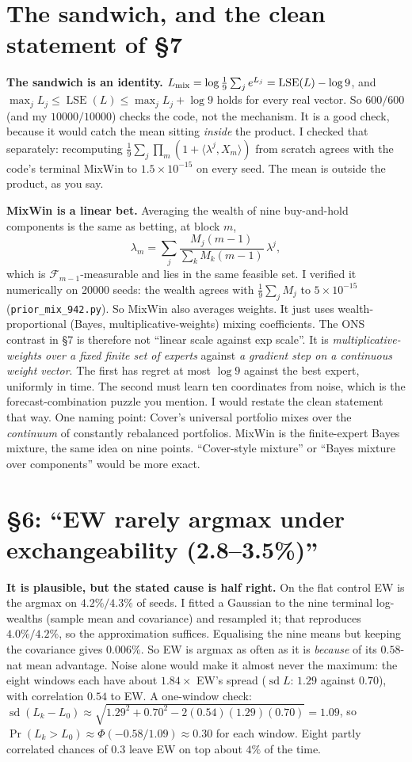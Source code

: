 \documentclass[11pt]{article}
\begin{document}
\section{The sandwich, and the clean statement of \S7}\label{sec:sandwich}
\textbf{The sandwich is an identity.} $L_{\rm mix}=\log\frac19\sum_j e^{L_j}=\operatorname{LSE}(L)-\log9$, and $\max_jL_j\le\operatorname{LSE}(L)\le\max_jL_j+\log9$ holds for every real vector. So $600/600$ (and my $10000/10000$) checks the code, not the mechanism. It is a good check, because it would catch the mean sitting \emph{inside} the product. I checked that separately: recomputing $\frac19\sum_j\prod_m(1+\langle\lambda^j,X_m\rangle)$ from scratch agrees with the code's terminal MixWin to $1.5\times10^{-15}$ on every seed. The mean is outside the product, as you say.

\textbf{MixWin is a linear bet.} Averaging the wealth of nine buy-and-hold components is the same as betting, at block $m$,
\[
\lambda_m=\sum_j \frac{M_j(m-1)}{\sum_k M_k(m-1)}\,\lambda^j ,
\]
which is $\mathcal F_{m-1}$-measurable and lies in the same feasible set. I verified it numerically on 20000 seeds: the wealth agrees with $\frac19\sum_jM_j$ to $5\times10^{-15}$ (\texttt{prior\_mix\_942.py}).
So MixWin also averages weights. It just uses wealth-proportional (Bayes, multiplicative-weights) mixing coefficients. The ONS contrast in \S7 is therefore not ``linear scale against exp scale''. It is \emph{multiplicative-weights over a fixed finite set of experts} against \emph{a gradient step on a continuous weight vector}. The first has regret at most $\log 9$ against the best expert, uniformly in time. The second must learn ten coordinates from noise, which is the forecast-combination puzzle you mention.
I would restate the clean statement that way. One naming point: Cover's universal portfolio mixes over the \emph{continuum} of constantly rebalanced portfolios. MixWin is the finite-expert Bayes mixture, the same idea on nine points. ``Cover-style mixture'' or ``Bayes mixture over components'' would be more exact.

\section{\texorpdfstring{\S6: ``EW rarely argmax under exchangeability (2.8--3.5\%)''}{Sec. 6: EW rarely argmax}}\label{sec:argmax}
\textbf{It is plausible, but the stated cause is half right.} On the flat control EW is the argmax on $4.2\%/4.3\%$ of seeds. I fitted a Gaussian to the nine terminal log-wealths (sample mean and covariance) and resampled it; that reproduces $4.0\%/4.2\%$, so the approximation suffices.
Equalising the nine means but keeping the covariance gives $0.006\%$. So EW is argmax as often as it is \emph{because} of its $0.58$-nat mean advantage. Noise alone would make it almost never the maximum: the eight windows each have about $1.84\times$ EW's spread ($\operatorname{sd}L$: $1.29$ against $0.70$), with correlation $0.54$ to EW.
A one-window check: $\operatorname{sd}(L_k-L_0)\approx\sqrt{1.29^2+0.70^2-2(0.54)(1.29)(0.70)}=1.09$, so $\Pr(L_k>L_0)\approx\Phi(-0.58/1.09)\approx0.30$ for each window. Eight partly correlated chances of $0.3$ leave EW on top about $4\%$ of the time.
\end{document}
